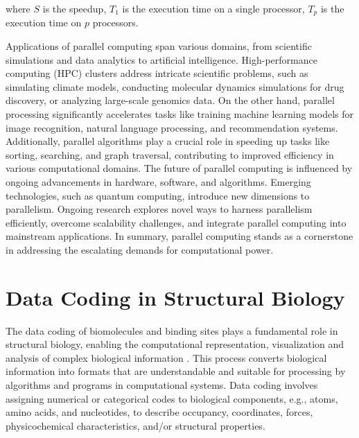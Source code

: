 \documentclass[Ingles]{phdthesis}
\def\eg{e.g.\onedot}
\begin{document}
\noindent where \(S\) is the speedup, \(T_1\) is the execution time on a single processor, \(T_p\) is the execution time on \(p\) processors.

Applications of parallel computing span various domains, from scientific simulations and data analytics to artificial intelligence. High-performance computing (HPC) clusters address intricate scientific problems, such as simulating climate models, conducting molecular dynamics simulations for drug discovery, or analyzing large-scale genomics data. On the other hand, parallel processing significantly accelerates tasks like training machine learning models for image recognition, natural language processing, and recommendation systems. Additionally, parallel algorithms play a crucial role in speeding up tasks like sorting, searching, and graph traversal, contributing to improved efficiency in various computational domains. The future of parallel computing is influenced by ongoing advancements in hardware, software, and algorithms. Emerging technologies, such as quantum computing, introduce new dimensions to parallelism. Ongoing research explores novel ways to harness parallelism efficiently, overcome scalability challenges, and integrate parallel computing into mainstream applications. In summary, parallel computing stands as a cornerstone in addressing the escalating demands for computational power.


\chapter{Data Coding in Structural Biology}

The data coding of biomolecules and binding sites plays a fundamental role in structural biology, enabling the computational representation, visualization and analysis of complex biological information \cite{kozlikova2016}. This process converts biological information into formats that are understandable and suitable for processing by algorithms and programs in computational systems. Data coding involves assigning numerical or categorical codes to biological components, \eg, atoms, amino acids, and nucleotides, to describe occupancy, coordinates, forces, physicochemical characteristics, and/or structural properties.
\end{document}
